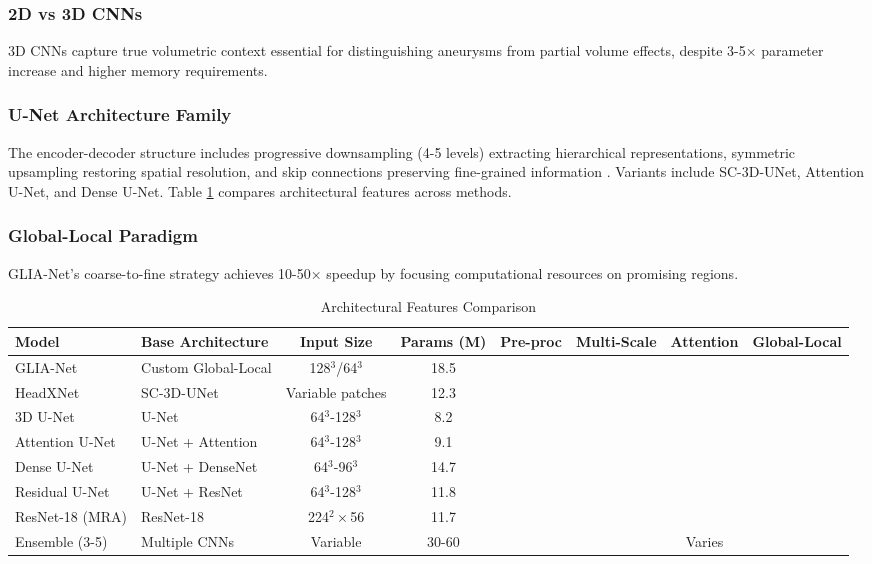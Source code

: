 \documentclass[conference]{IEEEtran}
\newcommand{\cmark}{\ding{51}}
\newcommand{\xmark}{\ding{55}}
\begin{document}
\subsubsection{2D vs 3D CNNs}
3D CNNs capture true volumetric context essential for distinguishing aneurysms from partial volume effects, despite 3-5× parameter increase and higher memory requirements.

\subsubsection{U-Net Architecture Family}
The encoder-decoder structure includes progressive downsampling (4-5 levels) extracting hierarchical representations, symmetric upsampling restoring spatial resolution, and skip connections preserving fine-grained information \cite{ronneberger2015unet,cicek20163d}. Variants include SC-3D-UNet, Attention U-Net, and Dense U-Net. Table \ref{tab:architecture} compares architectural features across methods.

\subsubsection{Global-Local Paradigm}
GLIA-Net's coarse-to-fine strategy achieves 10-50× speedup by focusing computational resources on promising regions.

\begin{table}[htbp]
\caption{Architectural Features Comparison}
\begin{center}
\scriptsize
\begin{tabular}{|l|l|c|c|c|c|c|c|}
\hline
\textbf{Model} & \textbf{Base Architecture} & \textbf{Input Size} & \textbf{Params (M)} & \textbf{Pre-proc} & \textbf{Multi-Scale} & \textbf{Attention} & \textbf{Global-Local} \\
\hline
GLIA-Net & Custom Global-Local & 128$^3$/64$^3$ & 18.5 & \xmark & \cmark & \cmark & \cmark \\
\hline
HeadXNet & SC-3D-UNet & Variable patches & 12.3 & \cmark & \cmark & \xmark & \xmark \\
\hline
3D U-Net & U-Net & 64$^3$-128$^3$ & 8.2 & \cmark & \cmark & \xmark & \xmark \\
\hline
Attention U-Net & U-Net + Attention & 64$^3$-128$^3$ & 9.1 & \cmark & \cmark & \cmark & \xmark \\
\hline
Dense U-Net & U-Net + DenseNet & 64$^3$-96$^3$ & 14.7 & \cmark & \cmark & \xmark & \xmark \\
\hline
Residual U-Net & U-Net + ResNet & 64$^3$-128$^3$ & 11.8 & \cmark & \cmark & \xmark & \xmark \\
\hline
ResNet-18 (MRA) & ResNet-18 & 224$^2 \times$56 & 11.7 & \cmark & \cmark & \xmark & \xmark \\
\hline
Ensemble (3-5) & Multiple CNNs & Variable & 30-60 & \cmark & \cmark & Varies & \xmark \\
\hline
\end{tabular}
\label{tab:architecture}
\end{center}
\end{table}
\end{document}

